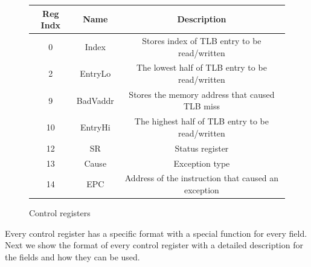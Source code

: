 \documentclass[]{scrartcl}
\begin{document}
\begin{figure}[H]
\begin{center}
\resizebox{0.9\textwidth}{!} {
\begin{tabular}{|c|c|c|}

\hline \textbf{Reg Indx} & \textbf{Name}  & \textbf{Description} \\

\hline 0     & Index    & Stores index of TLB entry to be read/written \\

\hline 2     & EntryLo  & The lowest half of TLB entry to be read/written \\

\hline 9     & BadVaddr & Stores the memory address that caused TLB miss \\

\hline 10    & EntryHi  & The highest half of TLB entry to be read/written \\

\hline 12    & SR       & Status register \\

\hline 13    & Cause    & Exception type \\

\hline 14    & EPC      & Address of the instruction that caused an exception\\

\hline

\end{tabular}
}

\end{center}
\caption{Control registers}
\label{ctrlregs}
\end{figure}

Every control register has a specific format with a special function
for every field. Next we show the format of every control register
with a detailed description for the fields and how they can be used.\\
\end{document}
